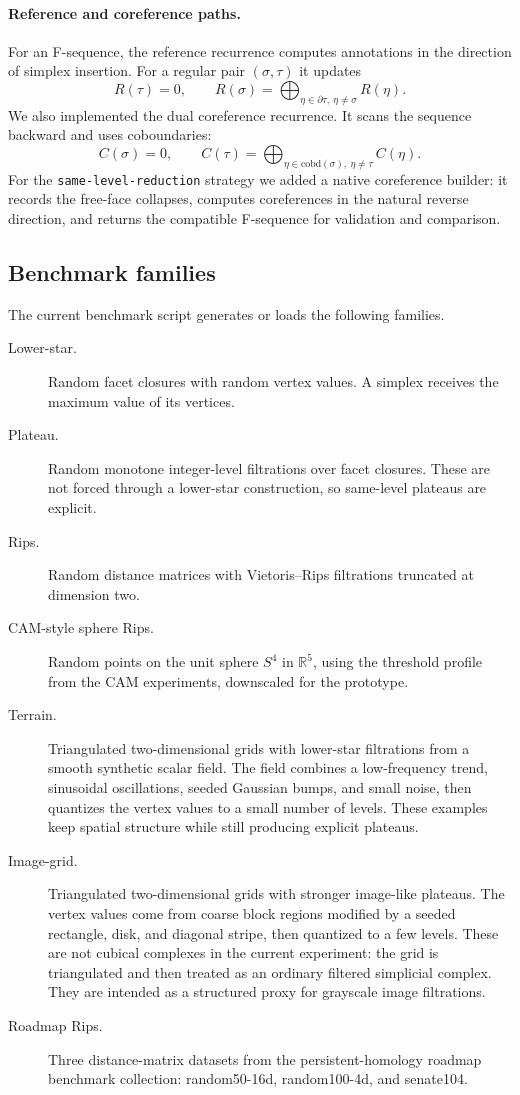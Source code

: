 \documentclass[11pt]{article}
\begin{document}
\paragraph{Reference and coreference paths.}
For an F-sequence, the reference recurrence computes annotations in the direction of
simplex insertion.  For a regular pair $(\sigma,\tau)$ it updates
\[
  R(\tau)=0, \qquad
  R(\sigma)=\bigoplus_{\eta\in \partial \tau,\ \eta\ne\sigma} R(\eta).
\]
We also implemented the dual coreference recurrence.  It scans the sequence backward and
uses coboundaries:
\[
  C(\sigma)=0, \qquad
  C(\tau)=\bigoplus_{\eta\in \mathrm{cobd}(\sigma),\ \eta\ne\tau} C(\eta).
\]
For the \texttt{same-level-reduction} strategy we added a native coreference builder:
it records the free-face collapses, computes coreferences in the natural reverse direction,
and returns the compatible F-sequence for validation and comparison.

\subsection{Benchmark families}

The current benchmark script generates or loads the following families.
\begin{description}
  \item[Lower-star.] Random facet closures with random vertex values.  A simplex receives
        the maximum value of its vertices.
  \item[Plateau.] Random monotone integer-level filtrations over facet closures.  These are
        not forced through a lower-star construction, so same-level plateaus are explicit.
  \item[Rips.] Random distance matrices with Vietoris--Rips filtrations truncated at
        dimension two.
  \item[CAM-style sphere Rips.] Random points on the unit sphere $S^4$ in $\mathbb{R}^5$,
        using the threshold profile from the CAM experiments, downscaled for the prototype.
  \item[Terrain.] Triangulated two-dimensional grids with lower-star filtrations from a
        smooth synthetic scalar field.  The field combines a low-frequency trend,
        sinusoidal oscillations, seeded Gaussian bumps, and small noise, then quantizes the
        vertex values to a small number of levels.  These examples keep spatial structure
        while still producing explicit plateaus.
  \item[Image-grid.] Triangulated two-dimensional grids with stronger image-like plateaus.
        The vertex values come from coarse block regions modified by a seeded rectangle,
        disk, and diagonal stripe, then quantized to a few levels.  These are not cubical
        complexes in the current experiment: the grid is triangulated and then treated as
        an ordinary filtered simplicial complex.  They are intended as a structured
        proxy for grayscale image filtrations.
  \item[Roadmap Rips.] Three distance-matrix datasets from the persistent-homology roadmap
        benchmark collection: random50-16d, random100-4d, and senate104.
\end{description}
\end{document}
